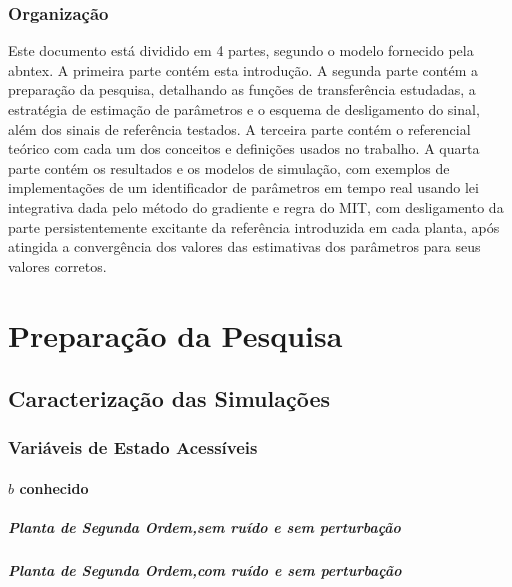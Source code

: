 \documentclass[
	12pt,				%
	openright,			%
	twoside,			%
	a4paper,			%
	english,			%
	french,				%
	spanish,			%
	brazil				%
	]{abntex2}
\begin{document}
\section{Organização}
Este documento está dividido em 4 partes, segundo o modelo fornecido pela abntex. A primeira parte contém esta introdução. A segunda parte contém a preparação da pesquisa, detalhando as funções de transferência estudadas, a estratégia de estimação de parâmetros e o esquema de desligamento do sinal, além dos sinais de referência testados. A terceira parte contém o referencial teórico com cada um dos conceitos e definições usados no trabalho. A quarta parte contém os resultados e os modelos de simulação, com exemplos de implementações
de um identificador de parâmetros em tempo real usando lei integrativa dada pelo método do gradiente
e regra do MIT, com desligamento da parte persistentemente excitante da referência introduzida em cada planta, após atingida a convergência dos valores das estimativas dos parâmetros para seus valores corretos. \\


 
\part{Preparação da Pesquisa}
\chapter{Caracterização das Simulações}
\section{Variáveis de Estado Acessíveis}
\subsection{$b$ conhecido}
\subsubsection{Planta de Segunda Ordem,sem ruído e sem perturbação}
\subsubsection{Planta de Segunda Ordem,com ruído e sem perturbação}
\end{document}
